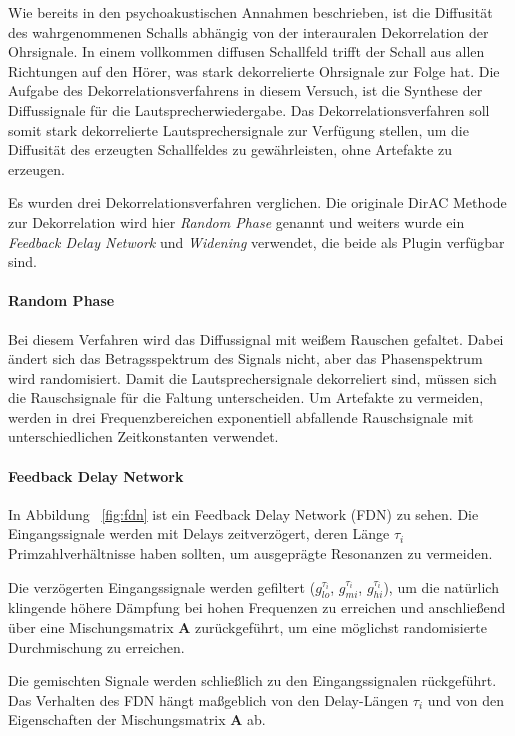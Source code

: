 Wie bereits in den psychoakustischen Annahmen beschrieben, ist die Diffusität des wahrgenommenen Schalls abhängig von der interauralen Dekorrelation der Ohrsignale. In einem vollkommen diffusen Schallfeld trifft der Schall aus allen Richtungen auf den Hörer, was stark dekorrelierte Ohrsignale zur Folge hat. Die Aufgabe des Dekorrelationsverfahrens in diesem Versuch, ist die Synthese der Diffussignale für die Lautsprecherwiedergabe. Das Dekorrelationsverfahren soll somit stark dekorrelierte Lautsprechersignale zur Verfügung stellen, um die Diffusität des erzeugten Schallfeldes zu gewährleisten, ohne Artefakte zu erzeugen.

Es wurden drei Dekorrelationsverfahren verglichen. Die originale DirAC Methode zur Dekorrelation wird hier \textit{Random Phase} genannt und weiters wurde ein \textit{Feedback Delay Network} und \textit{Widening} verwendet, die beide als Plugin verfügbar sind.

\paragraph{Random Phase}
\label{randphas}
Bei diesem Verfahren wird das Diffussignal mit weißem Rauschen gefaltet. Dabei ändert sich das Betragsspektrum des Signals nicht, aber das Phasenspektrum wird randomisiert. Damit die Lautsprechersignale dekorreliert sind, müssen sich die Rauschsignale für die Faltung unterscheiden. Um Artefakte zu vermeiden, werden in drei Frequenzbereichen exponentiell abfallende Rauschsignale mit unterschiedlichen Zeitkonstanten verwendet.

\paragraph{Feedback Delay Network}

In Abbildung ~\ref{fig:fdn} ist ein Feedback Delay Network (FDN) zu sehen. Die Eingangssignale werden mit Delays zeitverzögert, deren Länge $\tau_i$ Primzahlverhältnisse haben sollten, um ausgeprägte Resonanzen zu vermeiden.

Die verzögerten Eingangssignale werden gefiltert ($g_{lo}^{\tau_i}$, $g_{mi}^{\tau_i}$, $g_{hi}^{\tau_i}$), um die natürlich klingende höhere Dämpfung bei hohen Frequenzen zu erreichen und anschließend über eine Mischungsmatrix $\mathbf{A}$ zurückgeführt, um eine möglichst randomisierte Durchmischung zu erreichen.

Die gemischten Signale werden schließlich zu den Eingangssignalen rückgeführt. Das Verhalten des FDN hängt maßgeblich von den Delay-Längen $\tau_i$ und von den Eigenschaften der Mischungsmatrix $\mathbf{A}$ ab.

